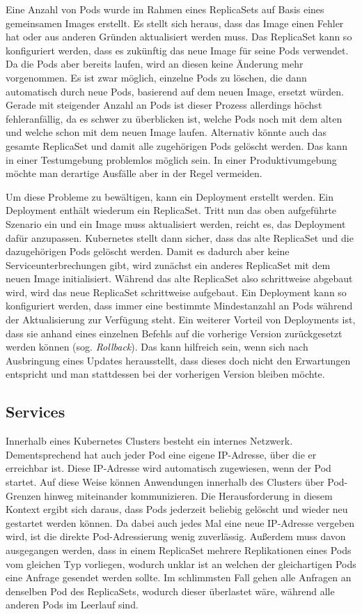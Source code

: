\documentclass[11pt,a4paper]{article}
\begin{document}
Eine Anzahl von Pods wurde im Rahmen eines ReplicaSets auf Basis eines gemeinsamen Images erstellt.
Es stellt sich heraus, dass das Image einen Fehler hat oder aus anderen Gründen aktualisiert werden muss.
Das ReplicaSet kann so konfiguriert werden, dass es zukünftig das neue Image für seine Pods verwendet.
Da die Pods aber bereits laufen, wird an diesen keine Änderung mehr vorgenommen. Es ist zwar möglich,
einzelne Pods zu löschen, die dann automatisch durch neue Pods, basierend auf dem neuen Image, ersetzt würden.
Gerade mit steigender Anzahl an Pods ist dieser Prozess allerdings höchst 
fehleranfällig, da es schwer zu überblicken ist, welche Pods noch mit dem alten und welche schon mit dem
neuen Image laufen. Alternativ könnte auch das gesamte ReplicaSet und damit alle zugehörigen Pods gelöscht werden.
Das kann in einer Testumgebung problemlos möglich sein. In einer Produktivumgebung möchte man derartige
Ausfälle aber in der Regel vermeiden.

Um diese Probleme zu bewältigen, kann ein Deployment erstellt werden.
Ein Deployment enthält wiederum ein ReplicaSet. Tritt nun das oben aufgeführte Szenario ein und ein Image
muss aktualisiert werden, reicht es, das Deployment dafür anzupassen.
Kubernetes stellt dann sicher, dass das alte ReplicaSet und die dazugehörigen Pods gelöscht werden.
Damit es dadurch aber keine Serviceunterbrechungen gibt, wird zunächst ein anderes ReplicaSet mit dem neuen
Image initialisiert. Während das alte ReplicaSet also schrittweise abgebaut wird, wird das neue ReplicaSet
schrittweise aufgebaut. Ein Deployment kann so konfiguriert werden, dass immer eine bestimmte Mindestanzahl an
Pods während der Aktualisierung zur Verfügung steht.
Ein weiterer Vorteil von Deployments ist, dass sie anhand eines einzelnen Befehls auf die vorherige Version
zurückgesetzt werden können (sog. \emph{Rollback}). Das kann hilfreich sein, wenn sich nach Ausbringung eines
Updates herausstellt, dass dieses doch nicht den Erwartungen entspricht und man stattdessen bei der vorherigen
Version bleiben möchte.

\subsection{Services}
Innerhalb eines Kubernetes Clusters besteht ein internes Netzwerk. Dementsprechend hat auch jeder Pod
eine eigene IP-Adresse, über die er erreichbar ist. Diese IP-Adresse wird automatisch zugewiesen, wenn der Pod startet.
Auf diese Weise können Anwendungen innerhalb des Clusters über Pod-Grenzen hinweg miteinander kommunizieren.
Die Herausforderung in diesem Kontext ergibt sich daraus, dass Pods jederzeit beliebig gelöscht
und wieder neu gestartet werden können. Da dabei auch jedes Mal eine neue IP-Adresse vergeben wird,
ist die direkte Pod-Adressierung wenig zuverlässig. Außerdem muss davon ausgegangen werden, dass
in einem ReplicaSet mehrere Replikationen eines Pods vom gleichen Typ vorliegen, wodurch unklar ist
an welchen der gleichartigen Pods eine Anfrage gesendet werden sollte. Im schlimmsten Fall gehen alle Anfragen
an denselben Pod des ReplicaSets, wodurch dieser überlastet wäre, während alle anderen Pods im Leerlauf sind.
\end{document}

